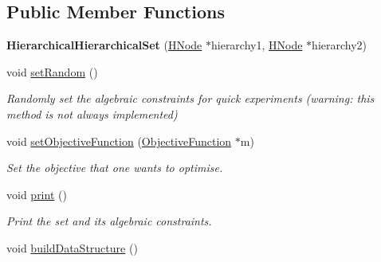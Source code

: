 \subsection*{Public Member Functions}
\begin{DoxyCompactItemize}
\item 
\hypertarget{classHierarchicalHierarchicalSet_ae239a8424b940258123c5d8505e44466}{{\bfseries Hierarchical\-Hierarchical\-Set} (\hyperlink{classHNode}{H\-Node} $\ast$hierarchy1, \hyperlink{classHNode}{H\-Node} $\ast$hierarchy2)}\label{classHierarchicalHierarchicalSet_ae239a8424b940258123c5d8505e44466}

\item 
\hypertarget{classHierarchicalHierarchicalSet_a668ee0e762ae12f0f059c35ccc6dc9fa}{void \hyperlink{classHierarchicalHierarchicalSet_a668ee0e762ae12f0f059c35ccc6dc9fa}{set\-Random} ()}\label{classHierarchicalHierarchicalSet_a668ee0e762ae12f0f059c35ccc6dc9fa}

\begin{DoxyCompactList}\small\item\em Randomly set the algebraic constraints for quick experiments (warning\-: this method is not always implemented) \end{DoxyCompactList}\item 
void \hyperlink{classHierarchicalHierarchicalSet_ae47e3171479131c47a2252b5c054ceef}{set\-Objective\-Function} (\hyperlink{classObjectiveFunction}{Objective\-Function} $\ast$m)
\begin{DoxyCompactList}\small\item\em Set the objective that one wants to optimise. \end{DoxyCompactList}\item 
\hypertarget{classHierarchicalHierarchicalSet_a860629468e7152d7642ef83f768673c2}{void \hyperlink{classHierarchicalHierarchicalSet_a860629468e7152d7642ef83f768673c2}{print} ()}\label{classHierarchicalHierarchicalSet_a860629468e7152d7642ef83f768673c2}

\begin{DoxyCompactList}\small\item\em Print the set and its algebraic constraints. \end{DoxyCompactList}\item 
\hypertarget{classHierarchicalHierarchicalSet_a28246c220b4d80d8c98cf8d6b5b46c01}{void \hyperlink{classHierarchicalHierarchicalSet_a28246c220b4d80d8c98cf8d6b5b46c01}{build\-Data\-Structure} ()}\label{classHierarchicalHierarchicalSet_a28246c220b4d80d8c98cf8d6b5b46c01}


\end{DoxyCompactItemize}
